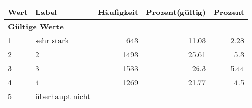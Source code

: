      \begin{longtable}{lXrrr}
     \toprule
     \textbf{Wert} & \textbf{Label} & \textbf{Häufigkeit} & \textbf{Prozent(gültig)} & \textbf{Prozent} \\
     \endhead
     \midrule
     \multicolumn{5}{l}{\textbf{Gültige Werte}}\\

     1 &
     \multicolumn{1}{X}{ sehr stark   } &


       \num{643} &
       \num[round-mode=places,round-precision=2]{11,03} &
         \num[round-mode=places,round-precision=2]{2,28} \\

     2 &
     \multicolumn{1}{X}{ 2   } &


       \num{1493} &
       \num[round-mode=places,round-precision=2]{25,61} &
         \num[round-mode=places,round-precision=2]{5,3} \\

     3 &
     \multicolumn{1}{X}{ 3   } &


       \num{1533} &
       \num[round-mode=places,round-precision=2]{26,3} &
         \num[round-mode=places,round-precision=2]{5,44} \\

     4 &
     \multicolumn{1}{X}{ 4   } &


       \num{1269} &
       \num[round-mode=places,round-precision=2]{21,77} &
         \num[round-mode=places,round-precision=2]{4,5} \\

     5 &
     \multicolumn{1}{X}{ überhaupt nicht   } &



\end{longtable}
